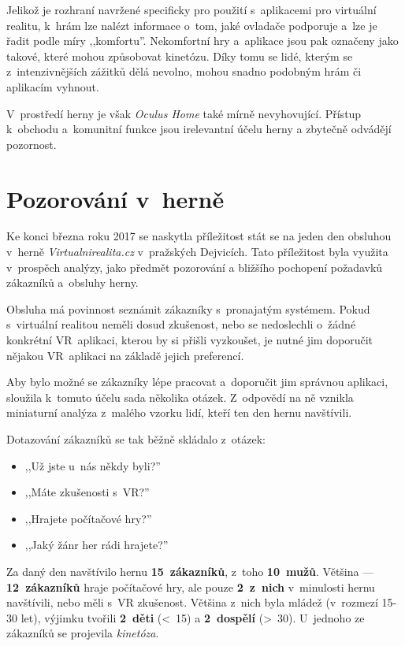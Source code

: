 Jelikož je rozhraní navržené specificky pro použití s~aplikacemi pro
virtuální realitu, k~hrám lze nalézt informace o~tom, jaké ovladače
podporuje a~lze je řadit podle míry ,,komfortu''. Nekomfortní hry a~aplikace jsou
pak označeny jako takové, které mohou způsobovat kinetózu. Díky tomu se
lidé, kterým se z~intenzivnějších zážitků dělá nevolno, mohou snadno podobným
hrám či aplikacím vyhnout.

V~prostředí herny je však \emph{Oculus Home} také mírně nevyhovující.
Přístup k~obchodu a~komunitní funkce jsou irelevantní účelu herny a
zbytečně odvádějí pozornost.

\section{Pozorování v~herně}\label{pozorovuxe1nuxed-v-hernux11b}

Ke konci března roku 2017 se naskytla příležitost stát se na jeden den
obsluhou v~herně \emph{Virtualnirealita.cz} v~pražských Dejvicích. Tato
příležitost byla využita v~prospěch analýzy, jako předmět pozorování a
bližšího pochopení požadavků zákazníků a~obsluhy herny.

Obsluha má povinnost seznámit zákazníky s~pronajatým
systémem. Pokud s~virtuální realitou neměli dosud zkušenost, nebo se
nedoslechli o~žádné konkrétní VR~aplikaci, kterou by si přišli
vyzkoušet, je nutné jim doporučit nějakou VR~aplikaci na základě jejich preferencí.

Aby bylo možné se zákazníky lépe pracovat a~doporučit jim správnou
aplikaci, sloužila k~tomuto účelu sada několika otázek. Z~odpovědí na ně vznikla
miniaturní analýza z~malého vzorku lidí, kteří ten den hernu navštívili.

Dotazování zákazníků se tak běžně skládalo z~otázek: 

\begin{itemize}
\tightlist
\item
,,Už jste u~nás
někdy byli?''
\item
  ,,Máte zkušenosti s~VR?''
\item
  ,,Hrajete počítačové hry?''
\item
  ,,Jaký žánr her rádi hrajete?''
\end{itemize}

Za daný den navštívilo hernu \textbf{15~zákazníků}, z~toho \textbf{10~mužů}. 
Většina --- \textbf{12~zákazníků} hraje počítačové hry, ale pouze
\textbf{2~z~nich} v~minulosti hernu navštívili, nebo měli s~VR
zkušenost. Většina z~nich byla mládež (v~rozmezí 15-30 let), výjimku
tvořili \textbf{2~děti} (\textless{}~15) a \textbf{2~dospělí}
(\textgreater{}~30). U~jednoho ze zákazníků se projevila
\emph{kinetóza}.

